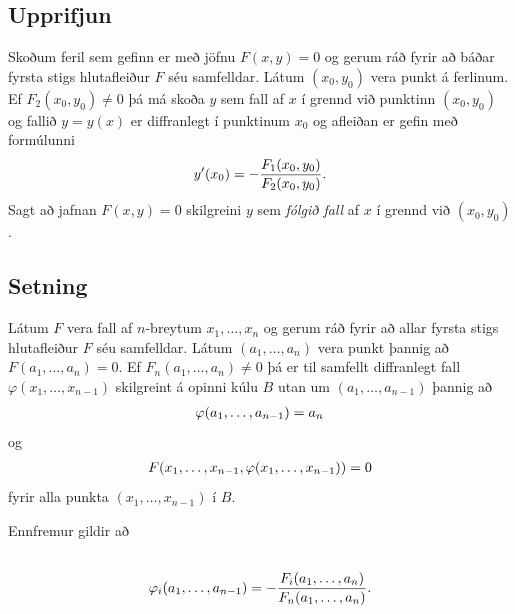 \documentclass[a4paper,10pt,icelandic]{sphinxmanual}
\begin{document}
\subsection{Upprifjun}
\label{Kafli2:index-25}\label{Kafli2:upprifjun}
Skoðum feril sem gefinn er með jöfnu \(F(x,y)=0\) og gerum ráð fyrir
að báðar fyrsta stigs hlutafleiður \(F\) séu samfelldar. Látum
\((x_0,y_0)\) vera punkt á ferlinum. Ef \(F_2(x_0,y_0)\neq 0\)
þá má skoða \(y\) sem fall af \(x\) í grennd við punktinn
\((x_0,y_0)\) og fallið \(y=y(x)\) er diffranlegt í punktinum
\(x_0\) og afleiðan er gefin með formúlunni
\begin{gather}
\begin{split}\displaystyle y'(x_0)=-\frac{F_1(x_0,y_0)}{F_2(x_0,y_0)}.\end{split}\notag
\end{gather}
Sagt að jafnan \(F(x,y)=0\) skilgreini \(y\) sem \textit{fólgið fall}
af \(x\) í grennd við \((x_0,y_0)\).


\subsection{Setning}
\label{Kafli2:id53}
Látum \(F\) vera fall af \(n\)-breytum \(x_1, \ldots,
x_n\) og gerum ráð fyrir að allar fyrsta stigs hlutafleiður \(F\) séu
samfelldar. Látum \((a_1,\ldots,a_n)\) vera punkt þannig að
\(F(a_1,\ldots,a_n)=0\). Ef \(F_n(a_1,\ldots,a_n)\neq 0\) þá er
til samfellt diffranlegt fall \(\varphi(x_1, \ldots, x_{n-1})\)
skilgreint á opinni kúlu \(B\) utan um \((a_1,\ldots,a_{n-1})\)
þannig að
\begin{gather}
\begin{split}\displaystyle \varphi(a_1,\ldots,a_{n-1})=a_n\end{split}\notag
\end{gather}
og
\begin{gather}
\begin{split}\displaystyle F(x_1,\ldots, x_{n-1}, \varphi(x_1, \ldots, x_{n-1}))=0\end{split}\notag
\end{gather}
fyrir alla punkta \((x_1, \ldots, x_{n-1})\) í \(B\).

Ennfremur gildir að
\begin{gather}
\begin{split}\displaystyle\end{split}\notag\\\begin{split}\varphi_i(a_1,\ldots,a_{n-1})
=-\frac{F_i(a_1,\ldots,a_n)}{F_n(a_1,\ldots,a_n)}.\end{split}\notag
\end{gather}
\end{document}

